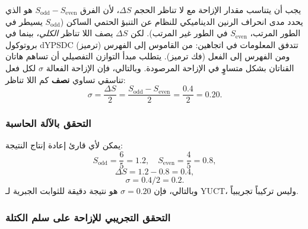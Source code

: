 \documentclass[11pt,a4paper]{article}
\begin{document}
	يجب أن يتناسب مقدار الإزاحة مع لا تناظر الحجم \(\Delta S\)، لأن الفرق \(S_{\mathrm{odd}} - S_{\mathrm{even}}\) هو الذي يحدد مدى انحراف الرنين الديناميكي للنظام عن التنبؤ الحتمي الساكن (\(S_{\mathrm{odd}}\) يسيطر في الطور المرتب، \(S_{\mathrm{even}}\) في الطور غير المرتب). لكن \(\Delta S\) يصف اللا تناظر \textit{الكلي}، بينما في بروتوكول dYPSDC تتدفق المعلومات في اتجاهين: من القاموس إلى الفهرس (ترميز) ومن الفهرس إلى الفعل (فك ترميز). يتطلب مبدأ التوازن التفصيلي أن تساهم هاتان القناتان بشكل متساوٍ في الإزاحة المرصودة. وبالتالي، فإن الإزاحة الفعالة \(\sigma\) لكل فعل تناسقي تساوي \textbf{نصف} كم اللا تناظر:
	\begin{equation}
		\boxed{\sigma = \frac{\Delta S}{2} = \frac{S_{\mathrm{odd}} - S_{\mathrm{even}}}{2} = \frac{0.4}{2} = 0.20.}
		\label{eq:sigma_final}
	\end{equation}
	
	\subsubsection{التحقق بالآلة الحاسبة}
	
	يمكن لأي قارئ إعادة إنتاج النتيجة:
	\[
	S_{\mathrm{odd}} = \frac{6}{5} = 1.2,\quad S_{\mathrm{even}} = \frac{4}{5} = 0.8,
	\]
	\[
	\Delta S = 1.2 - 0.8 = 0.4,
	\]
	\[
	\sigma = 0.4 / 2 = 0.2.
	\]
	وبالتالي، فإن \(\sigma = 0.20\) هو نتيجة دقيقة للثوابت الجبرية لـ YUCT، وليس تركيباً تجريبياً.
	
	\subsubsection{التحقق التجريبي للإزاحة على سلم الكتلة}
	
\end{document}

